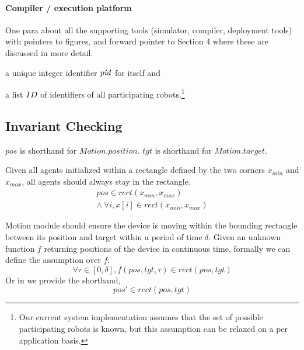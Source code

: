 \paragraph{Compiler / execution platform}
One para about all the supporting tools (simulator, compiler, deployment tools) with pointers to figures, and forward pointer to Section 4 where these are discussed in more detail.


\begin{inparaenum}[(a)]
\item a unique integer identifier $\mathit{pid}$ for itself and
\item a list $ID$ of identifiers of all participating robots.\footnote{Our current system implementation assumes that the set of possible participating robots is known, but this assumption can be relaxed on a per application basis.}
\end{inparaenum}



\subsection{Invariant Checking}

$pos$ is shorthand for $Motion.position$. $tgt$ is shorthand for $Motion.target$.

\begin{invariant}\label{inv:lineform}
Given all agents initialized within a rectangle defined by the two corners $x_{min}$ and $x_{max}$,
all agents should always stay in the rectangle.
\[
\begin{split}
    pos \in rect(x_{min}, x_{max})        \\
    \land\ \forall i, x[i] \in rect(x_{min}, x_{max})
\end{split}
\]
\end{invariant}


\begin{assumption}\label{lineform-assume}
Motion module should ensure the device is moving within the bounding rectangle between its position and target
within a period of time $\delta$.
Given an unknown function $f$ returning positions of the device in continuous time,
formally we can define the assumption over $f$:
\[
\forall \tau \in [0, \delta], f(pos, tgt, \tau) \in rect(pos, tgt)
\]
Or in \lgname we provide the shorthand,
\[
pos' \in rect(pos, tgt)
\]
\end{assumption}

